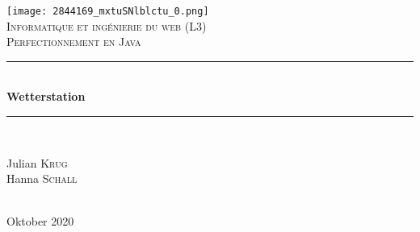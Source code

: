 \documentclass[a4paper]{report}
\begin{document}
\begin{titlepage}

\newcommand{\HRule}{\rule{\linewidth}{0.5mm}} %

\center %
 

\texttt{[image: 2844169\_mxtuSNlblctu\_0.png]}\\[1cm] %
\textsc{\Large Informatique et ingénierie du web (L3)}\\[0.5cm] %
\textsc{\large Perfectionnement en Java}\\[0.5cm] %


\HRule \\[0.4cm]
{ \huge \bfseries Wetterstation}\\[0.4cm] %
\HRule \\[1.5cm]
 

\begin{minipage}{0.4\textwidth}
\begin{flushleft} \large
Julian \textsc{Krug}\\ %
Hanna \textsc{Schall}\\ %
\end{flushleft}

\end{minipage}\\[2cm]



{\large Oktober 2020}\\[2cm] %

\vfill %

\end{titlepage}
\end{document}
